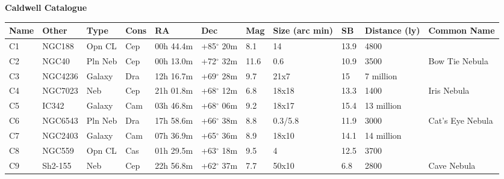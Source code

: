 \documentclass[10pt,twoside,a4paper,english]{article}
\begin{document}
 
 
 
 
 
 
\newpage 
\hspace{6 mm} 
{\bf Caldwell Catalogue}  
\begin{longtable}{@{}lllllllllll@{}} 
\hline 
{\bf Name} & {\bf Other} & {\bf Type} & {\bf Cons} & {\bf RA}  & {\bf Dec} & {\bf Mag} & {\bf Size (arc min)} & {\bf SB} & {\bf Distance (ly)} & {\bf Common Name}               \\ 
\hline 
C1         & NGC188      & Opn CL     & Cep       & 00h 44.4m & +85$^{\circ}$ 20m  & 8.1       & 14                   & 13.9     & 4800                &                                 \\ 
C2         & NGC40       & Pln Neb    & Cep       & 00h 13.0m & +72$^{\circ}$ 32m  & 11.6      & 0.6                  & 10.9     & 3500                & Bow Tie Nebula                  \\ 
C3         & NGC4236     & Galaxy     & Dra       & 12h 16.7m & +69$^{\circ}$ 28m  & 9.7       & 21x7                 & 15       & 7 million           &                                 \\ 
C4         & NGC7023     & Neb        & Cep       & 21h 01.8m & +68$^{\circ}$ 12m  & 6.8       & 18x18                & 13.3     & 1400                & Iris Nebula                     \\ 
C5         & IC342       & Galaxy     & Cam       & 03h 46.8m & +68$^{\circ}$ 06m  & 9.2       & 18x17                & 15.4     & 13 million          &                                 \\ 
C6         & NGC6543     & Pln Neb    & Dra       & 17h 58.6m & +66$^{\circ}$ 38m  & 8.8       & 0.3/5.8              & 11.9     & 3000                & Cat's Eye Nebula                \\ 
C7         & NGC2403     & Galaxy     & Cam       & 07h 36.9m & +65$^{\circ}$ 36m  & 8.9       & 18x10                & 14.1     & 14 million          &                                 \\ 
C8         & NGC559      & Opn CL     & Cas       & 01h 29.5m & +63$^{\circ}$ 18m  & 9.5       & 4                    & 12.5     & 3700                &                                 \\ 
C9         & Sh2-155     & Neb        & Cep       & 22h 56.8m & +62$^{\circ}$ 37m  & 7.7       & 50x10                & 6.8      & 2800                & Cave Nebula                     \\ 

\end{longtable}
\end{document}
